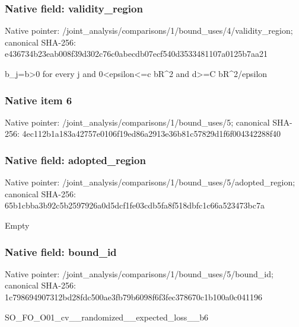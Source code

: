 \documentclass[10pt,a4paper]{article}
\begin{document}
\subsubsection{Native field: validity\_\allowbreak{}region}
Native pointer: /joint\_\allowbreak{}analysis/comparisons/1/bound\_\allowbreak{}uses/4/validity\_\allowbreak{}region; canonical SHA-256: e436734b23eab008f39d302c76c0abecdb07ecf540d3533481107a0125b7aa21

\begingroup\raggedright\sloppy b\_\allowbreak{}j=\allowbreak{}b>0 for every j and 0<epsilon<=\allowbreak{}c bR\textasciicircum{}2 and d>=\allowbreak{}C bR\textasciicircum{}2/\allowbreak{}epsilon\par\endgroup

\subsubsection{Native item 6}
Native pointer: /joint\_\allowbreak{}analysis/comparisons/1/bound\_\allowbreak{}uses/5; canonical SHA-256: 4ec112b1a183a42757e0106f19ed86a2913e36b81c57829d1f6f004342288f40

\subsubsection{Native field: adopted\_\allowbreak{}region}
Native pointer: /joint\_\allowbreak{}analysis/comparisons/1/bound\_\allowbreak{}uses/5/adopted\_\allowbreak{}region; canonical SHA-256: 65b1cbba3b92c5b2597926a0d5dcf1fe03cdb5fa8f518dbfc1c66a523473bc7a

\begingroup\raggedright\sloppy Empty\par\endgroup

\subsubsection{Native field: bound\_\allowbreak{}id}
Native pointer: /joint\_\allowbreak{}analysis/comparisons/1/bound\_\allowbreak{}uses/5/bound\_\allowbreak{}id; canonical SHA-256: 1c798694907312bd28fdc500ae3fb79b6098f6f3fec378670c1b100a0c041196

\begingroup\raggedright\sloppy SO\_\allowbreak{}FO\_\allowbreak{}O01\_\allowbreak{}cv\_\allowbreak{}\_\allowbreak{}randomized\_\allowbreak{}\_\allowbreak{}expected\_\allowbreak{}loss\_\allowbreak{}\_\allowbreak{}b6\par\endgroup
\end{document}
